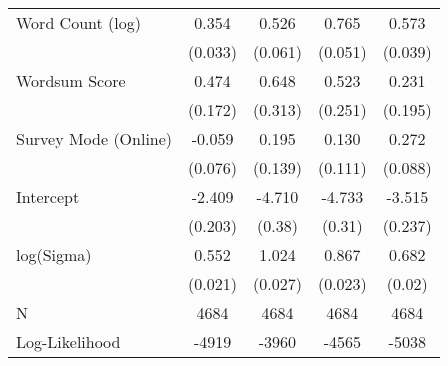 \begin{table}[ht]
\begin{tabular}{lcccc}
  Word Count (log) &  0.354 &  0.526 &  0.765 &  0.573 \\ 
   & (0.033) & (0.061) & (0.051) & (0.039) \\ 
  Wordsum Score &  0.474 &  0.648 &  0.523 &  0.231 \\ 
   & (0.172) & (0.313) & (0.251) & (0.195) \\ 
  Survey Mode (Online) & -0.059 &  0.195 &  0.130 &  0.272 \\ 
   & (0.076) & (0.139) & (0.111) & (0.088) \\ 
  Intercept & -2.409 & -4.710 & -4.733 & -3.515 \\ 
   & (0.203) & (0.38) & (0.31) & (0.237) \\ 
  log(Sigma) &  0.552 &  1.024 &  0.867 &  0.682 \\ 
   & (0.021) & (0.027) & (0.023) & (0.02) \\ 
   \hline
N & 4684 & 4684 & 4684 & 4684 \\ 
  Log-Likelihood & -4919 & -3960 & -4565 & -5038 \\ 
   \hline
\end{tabular}
\endgroup
\end{table}
